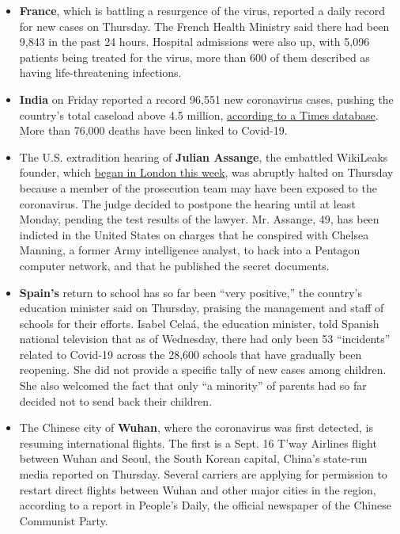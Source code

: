 \begin{itemize}
\item
  \textbf{France}, which is battling a resurgence of the virus, reported
  a daily record for new cases on Thursday. The French Health Ministry
  said there had been 9,843 in the past 24 hours. Hospital admissions
  were also up, with 5,096 patients being treated for the virus, more
  than 600 of them described as having life-threatening infections.
\item
  \textbf{India} on Friday reported a record 96,551 new coronavirus
  cases, pushing the country's total caseload above 4.5 million,
  \href{https://www.nytimes3xbfgragh.onion/interactive/2020/world/asia/india-coronavirus-cases.html}{according
  to a Times database}. More than 76,000 deaths have been linked to
  Covid-19.
\item
  The U.S. extradition hearing of \textbf{Julian Assange}, the embattled
  WikiLeaks founder, which
  \href{https://www.nytimes3xbfgragh.onion/2020/09/07/world/europe/assange-court-extradition-london.html}{began
  in London this week}, was abruptly halted on Thursday because a member
  of the prosecution team may have been exposed to the coronavirus. The
  judge decided to postpone the hearing until at least Monday, pending
  the test results of the lawyer. Mr. Assange, 49, has been indicted in
  the United States on charges that he conspired with Chelsea Manning, a
  former Army intelligence analyst, to hack into a Pentagon computer
  network, and that he published the secret documents.
\item
  \textbf{Spain's} return to school has so far been ``very positive,''
  the country's education minister said on Thursday, praising the
  management and staff of schools for their efforts. Isabel Celaá, the
  education minister, told Spanish national television that as of
  Wednesday, there had only been 53 ``incidents'' related to Covid-19
  across the 28,600 schools that have gradually been reopening. She did
  not provide a specific tally of new cases among children. She also
  welcomed the fact that only ``a minority'' of parents had so far
  decided not to send back their children.
\item
  The Chinese city of \textbf{Wuhan}, where the coronavirus was first
  detected, is resuming international flights. The first is a Sept. 16
  T'way Airlines flight between Wuhan and Seoul, the South Korean
  capital, China's state-run media reported on Thursday. Several
  carriers are applying for permission to restart direct flights between
  Wuhan and other major cities in the region, according to a report in
  People's Daily, the official newspaper of the Chinese Communist Party.
\end{itemize}

